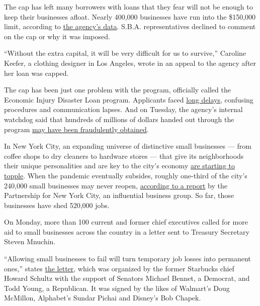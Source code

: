 The cap has left many borrowers with loans that they fear will not be
enough to keep their businesses afloat. Nearly 400,000 businesses have
run into the \$150,000 limit, according to
\href{https://www.sba.gov/funding-programs/loans/coronavirus-relief-options/economic-injury-disaster-loans\#section-header-5}{the
agency's data}. S.B.A. representatives declined to comment on the cap or
why it was imposed.

``Without the extra capital, it will be very difficult for us to
survive,'' Caroline Keefer, a clothing designer in Los Angeles, wrote in
an appeal to the agency after her loan was capped.

The cap has been just one problem with the program, officially called
the Economic Injury Disaster Loan program. Applicants faced
\href{https://www.nytimes3xbfgragh.onion/2020/04/09/business/smallbusiness/small-business-disaster-loans-coronavirus.html}{long
delays}, confusing procedures and communication lapses. And on Tuesday,
the agency's internal watchdog said that hundreds of millions of dollars
handed out through the program
\href{https://www.nytimes3xbfgragh.onion/live/2020/07/28/business/stock-market-today-coronavirus\#thieves-are-targeting-small-business-relief-programs-a-watchdog-says}{may
have been fraudulently obtained}.

In New York City, an expanding universe of distinctive small businesses
--- from coffee shops to dry cleaners to hardware stores --- that give
its neighborhoods their unique personalities and are key to the city's
economy
\href{https://www.nytimes3xbfgragh.onion/2020/08/03/nyregion/nyc-small-businesses-closing-coronavirus.html}{are
starting to topple}. When the pandemic eventually subsides, roughly
one-third of the city's 240,000 small businesses may never reopen,
\href{https://pfnyc.org/wp-content/uploads/2020/07/actionandcollaboration.pdf}{according
to a report} by the Partnership for New York City, an influential
business group. So far, those businesses have shed 520,000 jobs.

On Monday, more than 100 current and former chief executives called for
more aid to small businesses across the country in a letter sent to
Treasury Secretary Steven Mnuchin.

``Allowing small businesses to fail will turn temporary job losses into
permanent ones,'' states
\href{https://www.howardschultz.com/lettertocongress/}{the letter},
which was organized by the former Starbucks chief Howard Schultz with
the support of Senators Michael Bennet, a Democrat, and Todd Young, a
Republican. It was signed by the likes of Walmart's Doug McMillon,
Alphabet's Sundar Pichai and Disney's Bob Chapek.

